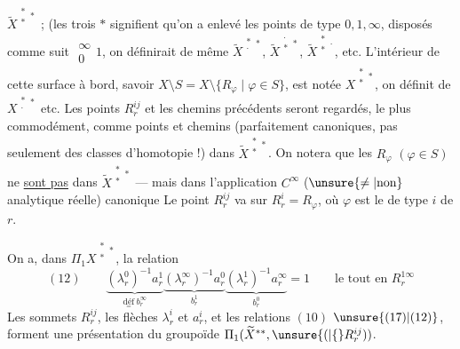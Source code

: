 
$\widetilde{X}^{\substack{*\\*}*}$ ; (les trois $*$ signifient qu'on a enlevé  les points de type $0,1,\infty$, disposés comme suit $\substack{\infty\\0}1$, on définirait de même $\widetilde{X}^{\substack{*\\\cdot}*}$, $\widetilde{X}^{\substack{\cdot\\*}*}$, $\widetilde{X}^{\substack{*\\*}\cdot}$, etc.  L'intérieur de cette surface à bord, savoir $X\setminus S=X\setminus\{R_\varphi\mid\varphi\in S\}$, est notée $X^{\substack{*\\*}*}$, on définit de \unsure{=} $X^{\substack{*\\\cdot}*}$ etc. Les points $R_r^{ij}$ et les chemins précédents seront regardés, le plus commodément, comme points et chemins (parfaitement canoniques, pas seulement des classes d'homotopie !) dans $\widetilde{X}^{\substack{*\\*}*}$. On notera que les $R_\varphi$ $(\varphi\in S)$ ne \uline{sont pas} dans $\widetilde{X}^{\substack{*\\*}*}$ --- mais dans l'application $C^\infty$ ($\unsure{\ne|\text{non}}$ analytique réelle) canonique
Le point $R_r^{ij}$ va sur $R_r^i=R_\varphi$, où $\varphi$ est le   de type $i$ de $r$.

On a, dans $\Pi_1 X^{\substack{*\\*}*}$, la relation
\[
(12)\qquad
\boxed{
\underbrace{(\lambda_r^0)^{-1}a_r^1}_{\underset{=}{\text{déf}}\ b_r^\infty}
\underbrace{(\lambda_r^\infty)^{-1}a_r^0}_{b_r^1}
\underbrace{(\lambda_r^1)^{-1}a_r^\infty}_{b_r^0}=1
}
\qquad\text{le tout en }R_r^{1\infty}
\]
Les sommets $R_r^{ij}$, les flèches $\lambda_r^i$ et $a_r^i$, et les relations $(10)$ $\unsure{(17)|(12)}$, forment une présentation du groupoïde $\Pi_1(\widetilde{X}^{\substack{*\\*}*},\unsure{(|\{}R_r^{ij}))$.

